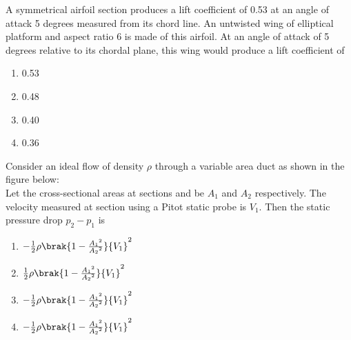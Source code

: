 	\item
	A symmetrical airfoil section produces a lift coefficient of 0.53 at an angle of attack 5 degrees measured from its chord line. An untwisted wing of elliptical platform and aspect ratio 6 is made of this airfoil. At an angle of attack of 5 degrees relative to its chordal plane, this wing would produce a lift coefficient of
		\begin{enumerate}
			\item 0.53
			\item 0.48
			\item 0.40
			\item 0.36
		\end{enumerate}
	\item
	Consider an ideal flow of density $\rho$ through a variable area duct as shown in the figure below:  \\
	
	
	
	Let the cross-sectional areas at sections  and  be $A_1$ and $A_2$ respectively. The velocity measured at section  using a Pitot static probe is $V_1$. Then the static pressure drop $p_2 - p_1$ is
		
		
		
		
		\begin{enumerate}
			\item $-\frac{1}{2}\rho\brak{1-\frac{{A_{1}}^{2}}{{A_{2}}^{2}}}{V_1}^{2}$
			\item $\frac{1}{2}\rho\brak{1-\frac{{A_{1}}^{2}}{{A_{2}}^{2}}}{V_1}^{2}$
			\item $-\frac{1}{2}\rho\brak{1-\frac{{A_{1}}^{2}}{{A_{2}}^{2}}}{V_1}^{2}$
			\item $-\frac{1}{2}\rho\brak{1-\frac{{A_{1}}^{2}}{{A_{2}}^{2}}}{V_1}^{2}$
		\end{enumerate}
	
